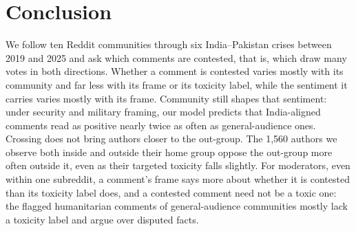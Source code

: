 \section{Conclusion}

We follow ten Reddit communities through six India--Pakistan crises between 2019 and 2025 and ask which comments are contested, that is, which draw many votes in both directions. Whether a comment is contested varies mostly with its community and far less with its frame or its toxicity label, while the sentiment it carries varies mostly with its frame. Community still shapes that sentiment: under security and military framing, our model predicts that India-aligned comments read as positive nearly twice as often as general-audience ones. Crossing does not bring authors closer to the out-group. The 1,560 authors we observe both inside and outside their home group oppose the out-group more often outside it, even as their targeted toxicity falls slightly. 
For moderators, even within one subreddit, a comment's frame says more about whether it is contested than its toxicity label does, and a contested comment need not be a toxic one: the flagged humanitarian comments of general-audience communities mostly lack a toxicity label and argue over disputed facts. 
